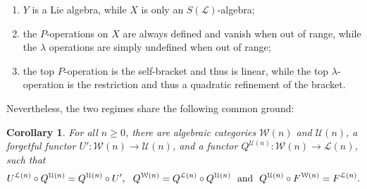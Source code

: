 \documentclass[11pt]{amsart} \renewcommand{\baselinestretch}{1.2}
\theoremstyle{plain}
\newtheorem{cor}[thm]{Corollary}
\numberwithin{equation}{section} %
\theoremstyle{plain}
\newtheorem{cor}[thm]{Corollary}
\numberwithin{equation}{chapter} %
\renewcommand{\to}{\longrightarrow}
\newcommand{\scrL}{\mathscr{L}}
\newcommand{\calU}{\mathcal{U}}
\newcommand{\calL}{\mathcal{L}}
\newcommand{\calw}{\mathcal{W}}
\newcommand{\calu}{\mathcal{U}}
\newcommand{\call}{\mathcal{L}}
\newcommand{\LieOperad}{{\scrL}}
\begin{document}
\begin{homotopy operations for PRLs}
\begin{enumerate}
\item $Y$ is a  Lie algebra, while $X$ is only an $S(\LieOperad)$-algebra;
\item the $P$-operations on $X$ are always defined and vanish when out of range, while the $\lambda$ operations are simply undefined when out of range;
\item the top $P$-operation is the self-bracket and thus is linear, while the top $\lambda$-operation is the restriction and thus a quadratic refinement of the bracket.
\end{enumerate}
Nevertheless, the two regimes share the following common ground:
\begin{cor}
\label{indec functors common ground 0 and n}
For all $n\geq0$, there are algebraic categories $\calw(n)$ and $\calU(n)$, a forgetful functor $U':\calw(n)\to\calU(n)$, and a functor $Q^{\calU(n)}:\calw(n)\to \calL(n)$, such that
\[U^{\call(n)}\circ Q^{\calu(n)}=Q^{\calu(n)}\circ  U',\ \ Q^{\calw(n)}=Q^{\calL(n)}\circ Q^{\calU(n)}\textup{\ \ and\ \ }Q^{\calU(n)}\circ F^{\calw(n)}=F^{\calL(n)}.\]
\end{cor}



\end{homotopy operations for PRLs}
\end{document}
